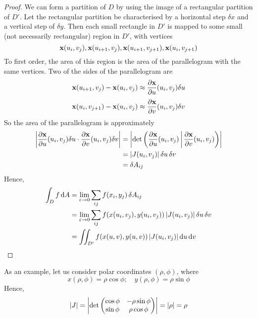 \begin{proof}
	We can form a partition of \(D\) by using the image of a rectangular partition of \(D'\).
	Let the rectangular partition be characterised by a horizontal step \(\delta x\) and a vertical step of \(\delta y\).
	Then each small rectangle in \(D'\) is mapped to some small (not necessarily rectangular) region in \(D'\), with vertices
	\[
		\vb x(u_i, v_j), \vb x(u_{i+1}, v_j), \vb x(u_{i+1}, v_{j+1}), \vb x(u_i, v_{j+1})
	\]
	To first order, the area of this region is the area of the parallelogram with the same vertices.
	Two of the sides of the parallelogram are
	\[
		\vb x(u_{i+1}, v_j) - \vb x(u_i, v_j) \approx \frac{\partial \vb x}{\partial u}(u_i, v_j) \delta u
	\]
	\[
		\vb x(u_i, v_{j+1}) - \vb x(u_i, v_j) \approx \frac{\partial \vb x}{\partial v}(u_i, v_j) \delta v
	\]
	So the area of the parallelogram is approximately
	\begin{align*}
		\abs{\frac{\partial \vb x}{\partial u}(u_i, v_j) \delta u \cdot \frac{\partial \vb x}{\partial v}(u_i, v_j) \delta v} & = \abs{\det \left( \frac{\partial \vb x}{\partial u}(u_i, v_j) \,\middle|\, \frac{\partial \vb x}{\partial v}(u_i, v_j) \right)} \\
		                                                                                                                      & = \abs{J(u_i, v_j)} \,\delta u \,\delta v                                                                                        \\
		                                                                                                                      & = \delta A_{ij}
	\end{align*}
	Hence,
	\begin{align*}
		\int_D f \dd{A} & = \lim_{\varepsilon \to 0} \sum_{ij} f(x_i, y_j)\,\delta A_{ij}                                           \\
		                & = \lim_{\varepsilon \to 0} \sum_{ij} f(x(u_i, v_j), y(u_i, v_j)) \,\abs{J(u_i, v_j)} \,\delta u\,\delta v \\
		                & = \iint_{D'} f(x(u, v), y(u, v)) \,\abs{J(u_i, v_j)} \dd{u} \dd{v}
	\end{align*}
\end{proof}
\noindent As an example, let us consider polar coordinates \((\rho, \phi)\), where
\[
	x(\rho, \phi) = \rho \cos \phi;\quad y(\rho, \phi) = \rho \sin \phi
\]
Hence,
\[
	\abs{J} = \abs{\det \begin{pmatrix}
			\cos \phi & -\rho \sin \phi \\
			\sin \phi & \rho \cos \phi
		\end{pmatrix}} = \abs{\rho} = \rho
\]
